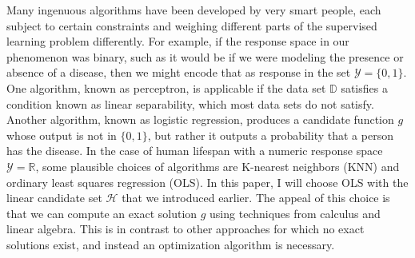 \documentclass[12pt]{article}
\begin{document}
	Many ingenuous algorithms have been developed by very smart people,
	each subject to certain constraints and weighing different parts of the
	supervised learning problem differently. For example, if the response
	space in our phenomenon was binary, such as it would be if we were modeling
	the presence or absence of a disease, then we might encode that as response in
	the set $\mathcal{Y}=\{0, 1\}$. One algorithm, known as perceptron, is
	applicable if the data set $\mathbb{D}$ satisfies a condition known as
	linear separability, which most data sets do not satisfy. Another algorithm,
	known as logistic regression, produces a candidate function $g$ whose
	output is not in $\{0, 1\}$, but rather it outputs a probability
	that a person has the disease. In the case of human lifespan with a numeric
	response space $\mathcal{Y}=\mathbb{R}$, some plausible choices of algorithms
	are K-nearest neighbors (KNN) and ordinary least squares regression (OLS).
	In this paper, I will choose OLS with the linear candidate set $\mathcal{H}$
	that we introduced earlier. The appeal of this choice is that we can
	compute an exact solution $g$ using techniques from calculus and
	linear algebra. This is in contrast to other approaches for which no
	exact solutions exist, and instead an optimization algorithm is necessary.
\end{document}
